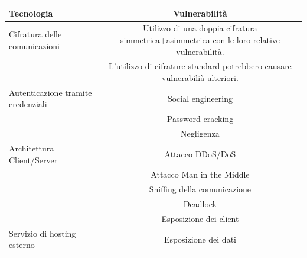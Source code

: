 \documentclass[a4paper]{article}
\begin{document}
\begin{center}
    \begin{tabulary}{1\textwidth}{L|C}
        \textbf{Tecnologia} & \textbf{Vulnerabilità} \\
        \hline
        \hline
        Cifratura delle comunicazioni & Utilizzo di una doppia cifratura simmetrica+asimmetrica con le loro relative vulnerabilità.\\
                                      & L'utilizzo di cifrature standard potrebbero causare vulnerabilià ulteriori.\\
        \hline
        Autenticazione tramite credenziali & Social engineering \\
                                           & Password cracking \\
                                           & Negligenza \\
        \hline
        Architettura Client/Server & Attacco DDoS/DoS \\
                                   & Attacco Man in the Middle\\
                                   & Sniffing della comunicazione\\
                                   & Deadlock\\
                                   & Esposizione dei client\\
        \hline
        Servizio di hosting esterno & Esposizione dei dati \\
        \hline
    \end{tabulary}
\end{center}
\end{document}
